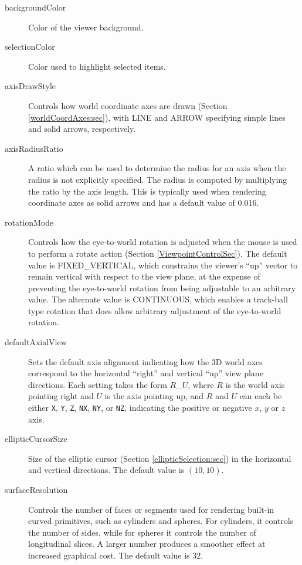 \documentclass{article}
\begin{document}
\begin{description}

\item[backgroundColor]\mbox{}

Color of the viewer background.

\item[selectionColor]\mbox{}

Color used to highlight selected items.

\item[axisDrawStyle]\mbox{}

Controls how world coordinate axes are drawn (Section
\ref{worldCoordAxes:sec}), with {\sf LINE} and {\sf ARROW} specifying
simple lines and solid arrows, respectively.

\item[axisRadiusRatio]\mbox{}

A ratio which can be used to determine the radius for an axis when the
radius is not explicitly specified. The radius is computed by
multiplying the ratio by the axis length. This is typically used when
rendering coordinate axes as solid arrows and has a default value of
0.016.

\item[rotationMode]\mbox{}

Controls how the eye-to-world rotation is adjusted when the mouse is
used to perform a rotate action (Section \ref{ViewpointControlSec}).
The default value is {\sf FIXED\_VERTICAL}, which constrains the
viewer's ``up'' vector to remain vertical with respect to the view
plane, at the expense of preventing the eye-to-world rotation from
being adjustable to an arbitrary value. The alternate value is {\sf
CONTINUOUS}, which enables a track-ball type rotation that does allow
arbitrary adjustment of the eye-to-world rotation.

\item[defaultAxialView]\mbox{}

Sets the default axis alignment indicating how the 3D world axes
correspond to the horizontal ``right'' and vertical ``up'' view plane
directions.  Each setting takes the form $R$\_$U$, where $R$ is the
world axis pointing right and $U$ is the axis pointing up, and $R$ and
$U$ can each be either {\tt X}, {\tt Y}, {\tt Z}, {\tt NX}, {\tt NY},
or {\tt NZ}, indicating the positive or negative $x$, $y$ or $z$ axis.

\item[ellipticCursorSize]\mbox{}

Size of the elliptic cursor (Section \ref{ellipticSelection:sec}) in
the horizontal and vertical directions. The default value is
$(10, 10)$.

\item[surfaceResolution]\mbox{}

Controls the number of faces or segments used for
rendering built-in curved primitives, such as cylinders and
spheres. For cylinders, it controls the number of sides, while for
spheres it controls the number of longitudinal slices. A larger number
produces a smoother effect at increased graphical cost. The default
value is 32.

\end{description}
\end{document}
